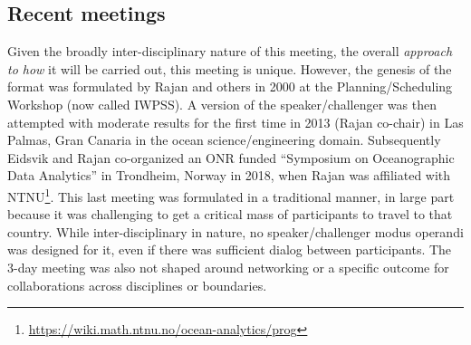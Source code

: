 \subsection{Recent meetings}

Given the broadly inter-disciplinary nature of this meeting, the overall
\emph{approach to how} it will be carried out, this meeting is
unique. However, the genesis of the format was formulated by Rajan and
others in 2000 at the \nas Planning/Scheduling Workshop (now called
IWPSS). A version of the speaker/challenger was then attempted with
moderate results for the first time in 2013 (Rajan co-chair) in Las
Palmas, Gran Canaria in the ocean science/engineering
domain. Subsequently Eidsvik and Rajan co-organized an ONR funded
``Symposium on Oceanographic Data Analytics'' in Trondheim, Norway in
2018, when Rajan was affiliated with
NTNU\footnote{\url{https://wiki.math.ntnu.no/ocean-analytics/prog}}. This
last meeting was formulated in a traditional manner, in large part
because it was challenging to get a critical mass of participants to
travel to that country. While inter-disciplinary in nature, no
speaker/challenger modus operandi was designed for it, even if there was
sufficient dialog between participants. The 3-day meeting was also not
shaped around networking or a specific outcome for collaborations across
disciplines or boundaries. 
